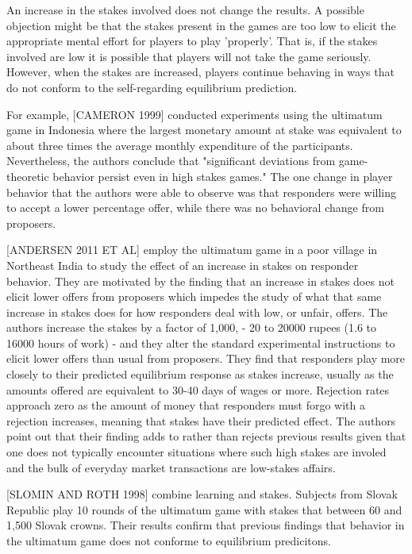 \message{ !name(tese.tex)}\documentclass{article}
\begin{document}
An increase in the stakes involved does not change the results. A possible objection might be that the stakes present in the games are too low to elicit the appropriate mental effort for players to play 'properly'. That is, if the stakes involved are low it is possible that players will not take the game seriously. However, when the stakes are increased, players continue behaving in ways that do not conform to the self-regarding equilibrium prediction.

For example, [CAMERON 1999] conducted experiments using the ultimatum game in Indonesia where the largest monetary amount at stake was equivalent to about three times the average monthly expenditure of the participants. Nevertheless, the authors conclude that "significant deviations from game-theoretic behavior persist even in high stakes games." The one change in player behavior that the authors were able to observe was that responders were willing to accept a lower percentage offer, while there was no behavioral change from proposers. 

[ANDERSEN 2011 ET AL] employ the ultimatum game in a poor village in Northeast India to study the effect of an increase in stakes on responder behavior. They are motivated by the finding that an increase in stakes does not elicit lower offers from proposers which impedes the study of what that same increase in stakes does for how responders deal with low, or unfair, offers. The authors increase the stakes by a factor of 1,000, - 20 to 20000 rupees (1.6 to 16000 hours of work) - and they alter the standard experimental instructions to elicit lower offers than usual from proposers. They find that responders play more closely to their predicted equilibrium response as stakes increase, usually as the amounts offered are equivalent to 30-40 days of wages or more. Rejection rates approach zero as the amount of money that responders must forgo with a rejection increases, meaning that stakes have their predicted effect. The authors point out that their finding adds to rather than rejects previous results given that one does not typically encounter situations where such high stakes are involed and the bulk of everyday market transactions are low-stakes affairs.


[SLOMIN AND ROTH 1998] combine learning and stakes. Subjects from Slovak Republic play 10 rounds of the ultimatum game with stakes that between 60 and 1,500 Slovak crowns. Their results confirm that previous findings that behavior in the ultimatum game does not conforme to equilibrium predicitons. 
\end{document}
